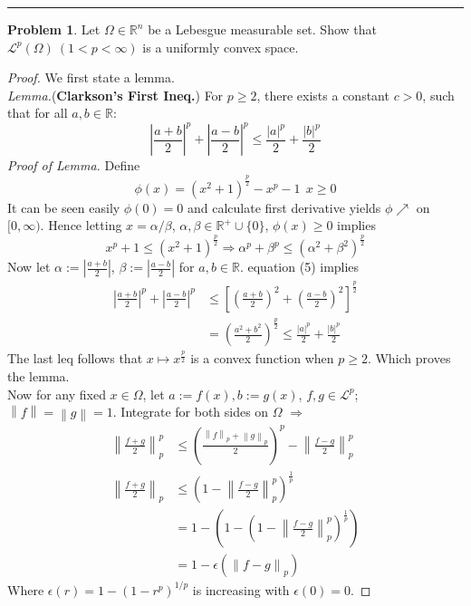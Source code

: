 \documentclass[a4paper, 10pt]{article}
\theoremstyle{definition}
\newtheorem{problem}{Problem}
\theoremstyle{hSol}
\begin{document}
\noindent\rule{16cm}{0.4pt}
\begin{problem} Let $\Omega \in \mathbb{R}^n$ be a Lebesgue measurable set. Show that $\mathcal{L}^p(\Omega)~(1<p<\infty)$ is a uniformly convex space.
\end{problem}
\begin{proof} We first state a lemma.\\
\textit{Lemma.}(\textbf{Clarkson's First Ineq.}) For $p\geq 2$, there exists a constant $c>0$, such that for all $a,b\in \mathbb{R}$:
\begin{equation}
	\left|\frac{a+b}{2}\right|^p + \left|\frac{a-b}{2}\right|^p \leq \frac{|a|^p}{2} + \frac{|b|^p}{2}
\end{equation}
\textit{Proof of Lemma.} Define
\begin{equation}
	\phi(x) = (x^2+1)^{\frac{p}{2}} - x^p - 1~~x\geq 0
\end{equation}
It can be seen easily $\phi(0)=0$ and calculate first derivative yields $\phi \nearrow$ on $[0, \infty)$. Hence letting $x=\alpha/\beta$, $\alpha, \beta \in \mathbb{R}^+\cup\{0\}$, $\phi(x)\geq 0$ implies
\begin{equation}
	x^p + 1 \leq (x^2+1)^{\frac{p}{2}} \Rightarrow \alpha^p + \beta^p \leq (\alpha^2 + \beta^2)^{\frac{p}{2}}
\end{equation}
Now let $\alpha:=\left|\frac{a+b}{2}\right|$, $\beta:=\left|\frac{a-b}{2}\right|$ for $a,b \in \mathbb{R}$. equation (5) implies
\begin{equation}
	\begin{split}
		\left|\frac{a+b}{2}\right|^p + \left|\frac{a-b}{2}\right|^p &\leq \left[\left(\frac{a+b}{2}\right)^2 + \left(\frac{a-b}{2}\right)^2\right]^{\frac{p}{2}} \\
		&= \left(\frac{a^2+b^2}{2}\right)^{\frac{p}{2}} \leq \frac{|a|^p}{2} + \frac{|b|^p}{2}
	\end{split}
\end{equation}
The last leq follows that $x\mapsto x^{\frac{p}{2}}$ is a convex function when $p\geq 2$. Which proves the lemma. \\
Now for any fixed $x\in \Omega$, let $a:=f(x), b:=g(x)$, $f,g \in \mathcal{L}^p$; $\left\|f\right\|=\left\|g\right\|=1$. Integrate for both sides on $\Omega$ $\Rightarrow$
\begin{equation}
	\begin{split}
		\left\|\frac{f+g}{2}\right\|^p_p  &\leq \left(\frac{\left\|f\right\|_p + \left\|g\right\|_p}{2}\right)^p - \left\|\frac{f-g}{2}\right\|^p_p \\
		\left\|\frac{f+g}{2}\right\|_p  &\leq \left(1 - \left\|\frac{f-g}{2}\right\|^p_p\right)^{\frac{1}{p}} \\
		&= 1- \left(1-\left(1 - \left\|\frac{f-g}{2}\right\|^p_p\right)^{\frac{1}{p}}\right) \\
		&= 1- \epsilon(\left\|f-g\right\|_p)
	\end{split}
\end{equation}
Where $\epsilon(r)=1-(1-r^p)^{1/p}$ is increasing with $\epsilon(0)=0$.
\end{proof}
\end{document}
